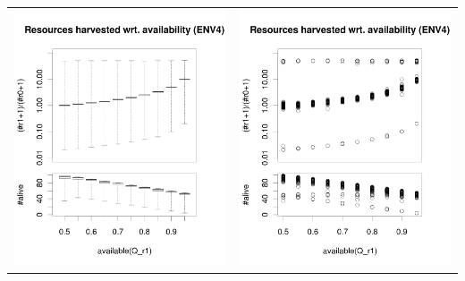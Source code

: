 \documentclass[a4paper,10pt]{article}
\begin{document}
\begin{table}[H]
\begin{tabular}{cc}
\includegraphics[width=\imgSize]{../images/5StaticEnv/ratioAndRep_staticEnv4LogY}&\includegraphics[width=\imgSize]{../images/5StaticEnv/ratioAndRep_staticEnvPlot4LogY}\\
\end{tabular}
\end{table}
\end{document}

